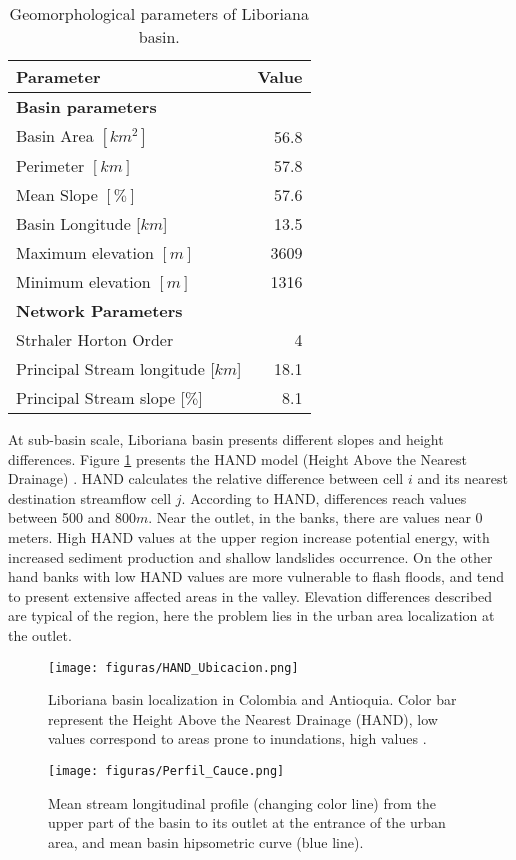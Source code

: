 {\begin{table}[t]
  \caption{Geomorphological parameters of Liboriana basin.}
  \begin{tabular}{lr}
  \hline
    \textbf{Parameter} & \textbf{Value} \\    
  \hline
    \textbf{Basin parameters} & \\
    Basin Area $[km^2]$ & 56.8\\
    Perimeter $[km]$ & 57.8\\
    Mean Slope $[\%]$ & 57.6\\
    Basin Longitude [$km$] & 13.5\\
    Maximum elevation $[m]$ & 3609\\
    Minimum elevation $[m]$ & 1316\\
  \hline
      \textbf{Network Parameters} & \\
      Strhaler Horton Order & 4\\
    Principal Stream longitude [$km$] & 18.1\\
    Principal Stream slope [$\%$] & 8.1\\
  \hline
  \end{tabular}
  \label{tab:geomorfologia}
\end{table}

At sub-basin scale, Liboriana basin presents different slopes and height differences.  Figure \ref{fig:Ubicacion} presents the HAND model (Height Above the Nearest Drainage)  \citep{Renno2008}. HAND calculates the relative difference between cell $i$ and its nearest destination streamflow cell $j$.  According to HAND,  differences reach values between 500 and 800$m$. Near the outlet, in the banks, there are values near 0 meters.  High HAND values at the upper region increase potential energy, with increased sediment production and shallow landslides occurrence.  On the other hand banks with low HAND values are more vulnerable to flash floods, and tend to present extensive affected areas in the valley.  Elevation differences described are typical of the region, here the problem lies in the urban area localization at the outlet.\\ 

\begin{figure}[t]
\centering
    \texttt{[image: figuras/HAND\_Ubicacion.png]}
    \caption{Liboriana basin localization in Colombia and Antioquia.  Color bar represent the Height Above the Nearest Drainage (HAND), low values correspond to areas prone to inundations, high values .}
    \label{fig:Ubicacion}
\end{figure}
\begin{figure}[t]
\centering
    \texttt{[image: figuras/Perfil\_Cauce.png]}
    \caption{Mean stream longitudinal profile (changing color line) from the upper part of the basin to its outlet at the entrance of the urban area, and mean basin hipsometric curve (blue line).}
    \label{fig:Perfil}
\end{figure}

}
